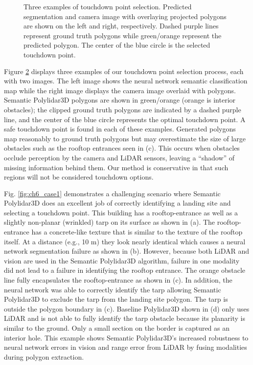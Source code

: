 \begin{figure}[!t]
\begin{subfigure}{.32\linewidth}
    \caption{\label{fig:ch6_qualitative_d}}
  \end{subfigure}
  \caption[Example touchdown point selection on rooftops]{Three examples of touchdown point selection. Predicted segmentation and camera image with overlaying projected polygons are shown on the left and right, respectively. Dashed purple lines represent ground truth polygons while green/orange represent the predicted polygon. The center of the blue circle is the selected touchdown point.     }\label{fig:ch6_qualitative}
\end{figure}

Figure \ref{fig:ch6_qualitative} displays three examples of our touchdown point selection process, each with two images. The left image shows the neural network semantic classification map while the right image displays the camera image overlaid with polygons.  Semantic Polylidar3D polygons are shown in green/orange (orange is interior obstacles); the clipped ground truth polygons are indicated by a dashed purple line, and the center of the blue circle represents the optimal touchdown point. A safe touchdown point is found in each of these examples.  Generated polygons map reasonably to ground truth polygons but may overestimate the size of large obstacles such as the rooftop entrances seen in (c). This occurs when obstacles occlude perception by the camera and LiDAR sensors, leaving a ``shadow'' of missing information behind them. Our method is conservative in that such regions will not be considered touchdown options. 

Fig. \ref{fig:ch6_case1} demonstrates a challenging scenario where Semantic Polylidar3D does an excellent job of correctly identifying a landing site and selecting a touchdown point. This building has a rooftop-entrance as well as a slightly non-planar (wrinkled) tarp on its surface as shown in (a). The rooftop-entrance has a concrete-like texture that is similar to the texture of the rooftop itself. At a distance (e.g., 10 m) they look nearly identical which causes a neural network segmentation failure as shown in (b). However, because both LiDAR and vision are used in the Semantic Polylidar3D algorithm,  failure in one modality did not lead to a failure in identifying the rooftop entrance. The orange obstacle line fully encapsulates the rooftop-entrance as shown in (c). In addition, the neural network was able to correctly identify the tarp allowing Semantic Polylidar3D to exclude the tarp from the landing site polygon. The tarp is outside the polygon boundary in (c). Baseline Polylidar3D shown in (d) only uses LiDAR and is not able to fully identify the tarp obstacle because its planarity is similar to the ground. Only a small section on the border is captured as an interior hole. This example shows Semantic Polylidar3D's increased robustness to neural network errors in vision and range error from LiDAR by fusing modalities during polygon extraction. 


